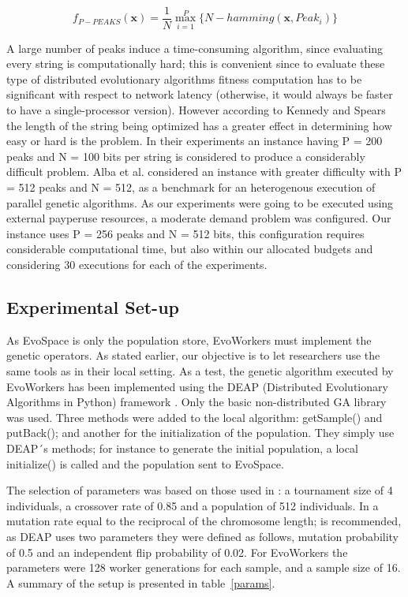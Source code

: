 \documentclass{llncs}
\begin{document}
\begin{equation}
f_{P-PEAKS}(\mathbf{x})=\frac{1}{N} \overset{P}{\max_{i=1}} \{N-hamming(\mathbf{x},Peak_i)   \}
\end{equation}

A large number of peaks induce a time-consuming algorithm,
since evaluating every string is computationally hard; this is
convenient since to evaluate these type of distributed evolutionary
algorithms fitness computation has to be significant with respect to
network latency (otherwise, it would always be faster to have a
single-processor version). However
according to Kennedy and Spears \cite{Kennedy:1998ch} the length of
the string being optimized has a greater effect in determining how
easy or hard is the problem. In their experiments an instance having P
= 200 peaks and N = 100 bits per string is considered to produce a
considerably difficult problem. Alba et al. \cite{Alba:2002dq}
considered an instance with greater difficulty with P = 512 peaks and
N = 512, as a benchmark for an heterogenous execution of parallel
genetic algorithms. As our  experiments were going to be executed
using external pay\textendash per\textendash use resources, a moderate
demand problem was configured. Our instance uses P = 256 peaks and N =
512 bits, this configuration requires considerable computational time,
but also within our allocated budgets and considering 30 executions for 
each of the experiments.

\subsection{Experimental Set-up}
As EvoSpace is only the population store, EvoWorkers must implement 
the genetic operators. As stated earlier, our objective is to let 
researchers use the same tools as in their local setting. As a test, 
the genetic algorithm executed by EvoWorkers has been implemented 
using the DEAP (Distributed Evolutionary Algorithms in Python) 
framework \cite{DEAP_JMLR2012}. Only the basic non-distributed GA 
library was used. Three methods were added to the local algorithm: 
getSample() and  putBack(); and  another for the  initialization 
of the population. They simply use DEAP´s methods; for instance to 
generate the initial population, a local initialize() is called 
and the population sent to EvoSpace.

The selection of parameters was based on those used in \cite{Alba:2002dq}: a
tournament size of 4 individuals, a crossover rate of 0.85 and a
population of 512 individuals. In  \cite{Jong:PS97} a mutation rate
equal to the reciprocal of the chromosome length; is recommended, as
DEAP uses two parameters they were defined as follows, mutation
probability of 0.5 and an independent flip probability of 0.02. For
EvoWorkers the parameters were 128 worker generations for each
sample, and a sample size of 16. A summary of the setup is presented in table~\ref{params}.
\end{document}
